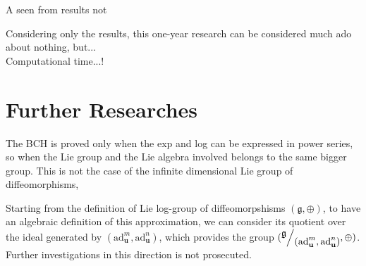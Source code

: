 

A seen from results not 


Considering only the results, this one-year research can be considered much ado about nothing, but...\\
Computational time...!

\section{Further Researches}\label{se:further_research}




The BCH is proved only when the exp and log can be expressed in power series, so when the Lie group and the Lie algebra involved belongs to the same bigger group. This is not the case of the infinite dimensional Lie group of diffeomorphisms,




Starting from the definition of Lie log-group of diffeomorpshisms $(\mathfrak{g} , \oplus)$, to have an algebraic definition of this approximation, we can consider its quotient over the ideal generated by $(\text{ad}_{\mathbf{u}}^{m}, \text{ad}_{\mathbf{u}}^{n})$, which provides the group $(\quotient{\mathfrak{g}}{(\text{ad}_{\mathbf{u}}^{m}, \text{ad}_{\mathbf{u}}^{n})}, \oplus)$. Further investigations in this direction is not prosecuted.

